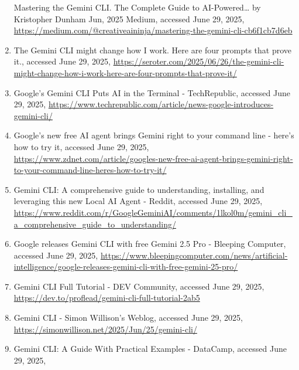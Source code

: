 \documentclass[a4paper,12pt]{article}
\begin{document}
\begin{multicols}{2}
\begin{enumerate}
      Mastering the Gemini CLI. The Complete Guide to AI-Powered\ldots{}
      \textbar{} by Kristopher Dunham \textbar{} Jun, 2025 \textbar{}
      Medium, accessed June 29, 2025,
      \href{https://medium.com/@creativeaininja/mastering-the-gemini-cli-cb6f1cb7d6eb}{https://medium.com/@creativeaininja/mastering-the-gemini-cli-cb6f1cb7d6eb}\\
    \item
      The Gemini CLI might change how I work. Here are four prompts that
      prove it., accessed June 29, 2025,
      \url{https://seroter.com/2025/06/26/the-gemini-cli-might-change-how-i-work-here-are-four-prompts-that-prove-it/}\\
    \item
      Google's Gemini CLI Puts AI in the Terminal - TechRepublic,
      accessed June 29, 2025,
      \url{https://www.techrepublic.com/article/news-google-introduces-gemini-cli/}\\
    \item
      Google's new free AI agent brings Gemini right to your command
      line - here's how to try it, accessed June 29, 2025,
      \url{https://www.zdnet.com/article/googles-new-free-ai-agent-brings-gemini-right-to-your-command-line-heres-how-to-try-it/}\\
    \item
      Gemini CLI: A comprehensive guide to understanding, installing,
      and leveraging this new Local AI Agent - Reddit, accessed June 29,
      2025,
      \url{https://www.reddit.com/r/GoogleGeminiAI/comments/1lkol0m/gemini_cli_a_comprehensive_guide_to_understanding/}\\
    \item
      Google releases Gemini CLI with free Gemini 2.5 Pro - Bleeping
      Computer, accessed June 29, 2025,
      \url{https://www.bleepingcomputer.com/news/artificial-intelligence/google-releases-gemini-cli-with-free-gemini-25-pro/}\\
    \item
      Gemini CLI Full Tutorial - DEV Community, accessed June 29, 2025,
      \url{https://dev.to/proflead/gemini-cli-full-tutorial-2ab5}\\
    \item
      Gemini CLI - Simon Willison's Weblog, accessed June 29, 2025,
      \url{https://simonwillison.net/2025/Jun/25/gemini-cli/}\\
    \item
      Gemini CLI: A Guide With Practical Examples - DataCamp, accessed
      June 29, 2025,

\end{enumerate}
\end{multicols}
\end{document}
